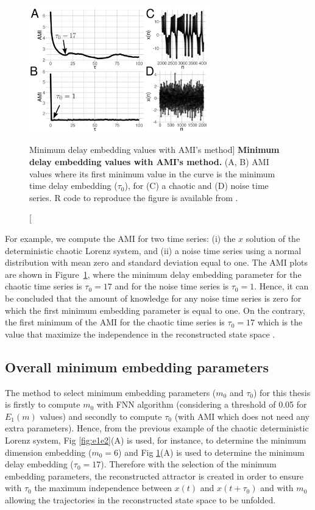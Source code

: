 \begin{figure}[!h]
  \centering
  \includegraphics[width=0.7\textwidth]{ami}
    \caption
	[Minimum delay embedding values with AMI's method]{
	{\bf Minimum delay embedding values with AMI's method.} 
    	(A, B) AMI values where its first minimum value in the curve
	is the minimum time delay embedding ($\tau_0$), 
	for (C) a chaotic and (D) noise time series.
	R code to reproduce the figure is available from \cite{hwum2018}.
        }
    \label{fig:amis}
\end{figure}
For example, we compute the AMI for two time series:
(i) the $x$ solution of the deterministic chaotic Lorenz system, and 
(ii) a noise time series using a normal distribution with mean zero and 
standard deviation equal to one. The AMI plots are shown in 
Figure~\ref{fig:amis}, where the minimum delay embedding parameter for 
the chaotic time series is $\tau_0=17$ and for the noise time series is  
$\tau_0=1$. Hence, it can be concluded that the amount of knowledge for 
any noise time series is zero for which the first minimum embedding 
parameter is equal to one. On the contrary, the first minimum of the AMI 
for the chaotic time series is $\tau_0=17$ which is the value that maximize 
the independence in the reconstructed state space \citep{bradley2015}.


\subsection{Overall minimum embedding parameters} \label{sec:overall_minMT}
The method to select minimum embedding parameters ($m_0$ and $\tau_0$) 
for this thesis is firstly to compute $m_0$ with FNN algorithm 
(considering a threshold of 0.05 for $E_1(m)$ values) and secondly
to compute $\tau_0$ (with AMI which does not need any extra parameters).
Hence, from the previous example of the chaotic deterministic 
Lorenz system, Fig \ref{fig:e1e2}(A) is used, for instance, to determine 
the minimum dimension embedding ($m_0 =6$) and 
Fig \ref{fig:amis}(A) is used to determine the minimum delay embedding 
($\tau_0 =17$).
Therefore with the selection of the minimum embedding parameters, the 
reconstructed attractor is created in order to ensure with $\tau_0$ the 
maximum independence between $x(t)$ and $x(t+\tau_0)$ and with $m_0$ 
allowing the trajectories in the reconstructed state space to be unfolded.

